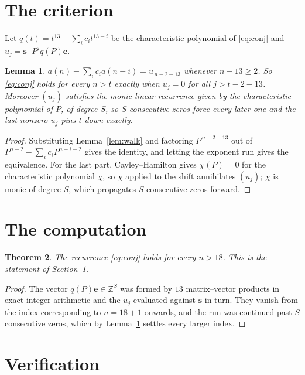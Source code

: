 \documentclass[11pt,a4paper]{article}
\theoremstyle{plain}
\newtheorem{theorem}{Theorem}
\newtheorem{lemma}[theorem]{Lemma}
\theoremstyle{definition}
\begin{document}
\section{The criterion}

Let $q(t)=t^{13}-\sum_i c_i t^{13-i}$ be the characteristic polynomial of
\eqref{eq:conj} and $u_j=\mathbf{s}^{\!\top}P^{j}q(P)\mathbf{e}$.

\begin{lemma}\label{lem:crit}
$a(n)-\sum_i c_i a(n-i)=u_{\,n-2-13}$ whenever $n-13\ge2$. So \eqref{eq:conj}
holds for every $n>t$ exactly when $u_j=0$ for all $j>t-2-13$. Moreover $(u_j)$
satisfies the monic linear recurrence given by the characteristic polynomial of $P$, of
degree $S$, so $S$ consecutive zeros force every later one and the last nonzero $u_j$ pins
$t$ down exactly.
\end{lemma}

\begin{proof}
Substituting Lemma~\ref{lem:walk} and factoring $P^{\,n-2-13}$ out of
$P^{n-2}-\sum_i c_i P^{n-i-2}$ gives the identity, and letting the exponent run gives the
equivalence. For the last part, Cayley--Hamilton gives $\chi(P)=0$ for the characteristic
polynomial $\chi$, so $\chi$ applied to the shift annihilates $(u_j)$; $\chi$ is monic of
degree $S$, which propagates $S$ consecutive zeros forward.
\end{proof}

\section{The computation}

\begin{theorem}
The recurrence \eqref{eq:conj} holds for every $n>18$. This is the statement of
Section~1.
\end{theorem}

\begin{proof}
The vector $q(P)\mathbf{e}\in\mathbb{Z}^{S}$ was formed by $13$ matrix--vector
products in exact integer arithmetic and the $u_j$ evaluated against $\mathbf{s}$ in turn.
They vanish from the index corresponding to $n=18+1$ onwards, and the run was continued
past $S$ consecutive zeros, which by Lemma~\ref{lem:crit} settles every larger index.
\end{proof}

\section{Verification}
\end{document}
